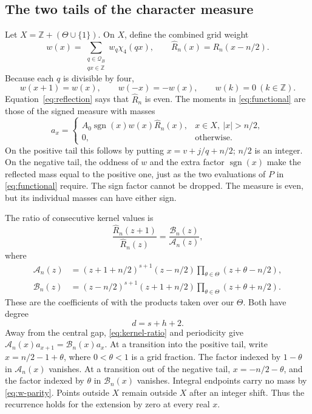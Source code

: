 \documentclass[11pt]{article}
\theoremstyle{remark}
\newcommand{\Z}{\mathbb Z}
\newcommand{\sgn}{\operatorname{sgn}}
\numberwithin{equation}{section}
\begin{document}
\subsection{The two tails of the character measure}
Let $X=\Z+(\Theta\cup\{1\})$. On $X$, define the combined grid weight
\[
 w(x)=\sum_{\substack{q\in\mathcal Q_B\\qx\in\Z}}w_q\chi_4(qx),
 \qquad \widehat R_n(x)=R_n(x-n/2).
\]
Because each $q$ is divisible by four,
\begin{equation}\label{eq:w-parity}
 w(x+1)=w(x),\qquad w(-x)=-w(x),\qquad w(k)=0\ (k\in\Z).
\end{equation}
Equation~\eqref{eq:reflection} says that $\widehat R_n$ is even.
The moments in \eqref{eq:functional} are those of the signed measure with
masses
\begin{equation}\label{eq:mass}
 a_x=
 \begin{cases}
  A_0\sgn(x)w(x)\widehat R_n(x),&x\in X,\ |x|>n/2,\\
  0,&\text{otherwise}.
 \end{cases}
\end{equation}
On the positive tail this follows by putting $x=v+j/q+n/2$; $n/2$ is
an integer. On the negative tail, the oddness of $w$ and the extra factor
$\sgn(x)$ make the reflected mass equal to the positive one, just as the
two evaluations of $P$ in \eqref{eq:functional} require. The sign factor
cannot be dropped. The measure is even, but its individual masses can
have either sign.

The ratio of consecutive kernel values is
\begin{equation}\label{eq:kernel-ratio}
 \frac{\widehat R_n(z+1)}{\widehat R_n(z)}
   =\frac{\mathcal B_n(z)}{\mathcal A_n(z)},
\end{equation}
where
\begin{align}
 \mathcal A_n(z)&=(z+1+n/2)^{s+1}(z-n/2)
                    \prod_{\theta\in\Theta}(z+\theta-n/2),\label{eq:A-rec}\\
 \mathcal B_n(z)&=(z-n/2)^{s+1}(z+1+n/2)
                    \prod_{\theta\in\Theta}(z+\theta+n/2).\label{eq:B-rec}
\end{align}
These are the coefficients of \cite[(5.11)]{FLSZ} with the products
taken over our $\Theta$. Both have degree
\[
 d=s+h+2.
\]
Away from the central gap, \eqref{eq:kernel-ratio} and periodicity give
$\mathcal A_n(x)a_{x+1}=\mathcal B_n(x)a_x$.
At a transition into the positive tail, write
$x=n/2-1+\theta$, where $0<\theta<1$ is a grid fraction. The factor
indexed by $1-\theta$ in $\mathcal A_n(x)$ vanishes. At a transition out
of the negative tail, $x=-n/2-\theta$, and the factor indexed by $\theta$
in $\mathcal B_n(x)$ vanishes. Integral endpoints carry no mass by
\eqref{eq:w-parity}. Points outside $X$ remain outside $X$ after an
integer shift. Thus the recurrence holds for the extension by zero at
every real $x$.
\end{document}
